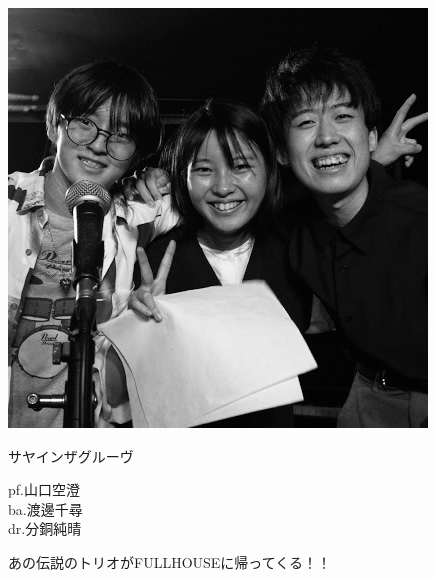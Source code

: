 \documentclass[a4paper]{article}
\begin{document}
\begin{minipage}{0.25\textheight}
    \flushleft
    \includegraphics[width=0.25\textheight]{./FULLHOUSE/resources/16.jpeg}
\end{minipage}
\begin{minipage}{\textwidth - 0.25\textheight}
    \flushleft
    \Huge \vspace{1em}サヤインザグルーヴ\vspace{1em}\normalsize \\
    \begin{minipage}{11em}
        \flushleft
        \Large
        pf.山口空澄\\ba.渡邊千尋\\dr.分銅純晴
    \end{minipage}
    \begin{minipage}{\textwidth - 18em}
        \flushleft
        \large
        あの伝説のトリオがFULLHOUSEに帰ってくる！！
    \end{minipage}
\end{minipage}

\newpage
\end{document}
